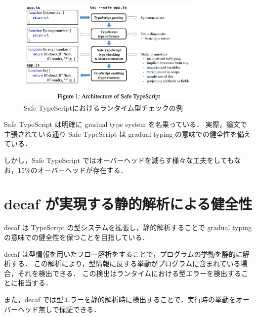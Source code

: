 \begin{figure}[H]
    \centering
    \includegraphics[width=0.8\textwidth]{figures/fig_overview_safe_typescript.png}
    \caption{Safe TypeScriptにおけるランタイム型チェックの例}
\end{figure}

Safe TypeScript は明確に gradual type system を名乗っている．
実際，論文で主張されている通り Safe TypeScript は gradual typing の意味での健全性を備えている．

しかし，Safe TypeScript ではオーバーヘッドを減らす様々な工夫をしてもなお，15\%のオーバーヘッドが存在する．

\section{decaf が実現する静的解析による健全性}

decaf は TypeScript の型システムを拡張し，静的解析することで gradual typing の意味での健全性を保つことを目指している．

decaf は型情報を用いたフロー解析をすることで，プログラムの挙動を静的に解析する．
この解析により，型情報に反する挙動がプログラムに含まれている場合，それを検出できる．
この検出はランタイムにおける型エラーを検出することに相当する．

また，decaf では型エラーを静的解析時に検出することで，実行時の挙動をオーバーヘッド無しで保証できる．

